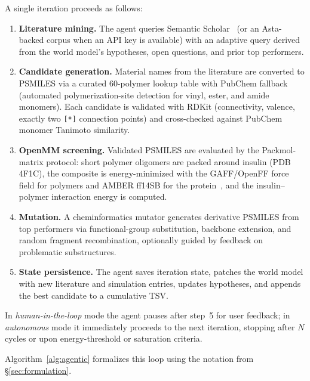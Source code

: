\documentclass[twocolumn]{fairmeta}
\begin{document}
A single iteration proceeds as follows:
\begin{enumerate}
\item \textbf{Literature mining.} The agent queries Semantic Scholar~\cite{lo2020s2orc} (or an Asta-backed corpus when an API key is available) with an adaptive query derived from the world model's hypotheses, open questions, and prior top performers.
\item \textbf{Candidate generation.} Material names from the literature are converted to PSMILES via a curated 60-polymer lookup table with PubChem fallback (automated polymerization-site detection for vinyl, ester, and amide monomers). Each candidate is validated with RDKit (connectivity, valence, exactly two \texttt{[*]} connection points) and cross-checked against PubChem monomer Tanimoto similarity.
\item \textbf{OpenMM screening.} Validated PSMILES are evaluated by the Packmol-matrix protocol: short polymer oligomers are packed around insulin (PDB 4F1C), the composite is energy-minimized with the GAFF/OpenFF force field for polymers and AMBER ff14SB for the protein~\cite{he2020amber,maier2015ff14sb,qiu2021development}, and the insulin--polymer interaction energy is computed.
\item \textbf{Mutation.} A cheminformatics mutator generates derivative PSMILES from top performers via functional-group substitution, backbone extension, and random fragment recombination, optionally guided by feedback on problematic substructures.
\item \textbf{State persistence.} The agent saves iteration state, patches the world model with new literature and simulation entries, updates hypotheses, and appends the best candidate to a cumulative TSV.
\end{enumerate}
In \emph{human-in-the-loop} mode the agent pauses after step~5 for user feedback; in \emph{autonomous} mode it immediately proceeds to the next iteration, stopping after $N$ cycles or upon energy-threshold or saturation criteria.

Algorithm~\ref{alg:agentic} formalizes this loop using the notation from \S\ref{sec:formulation}.
\end{document}
